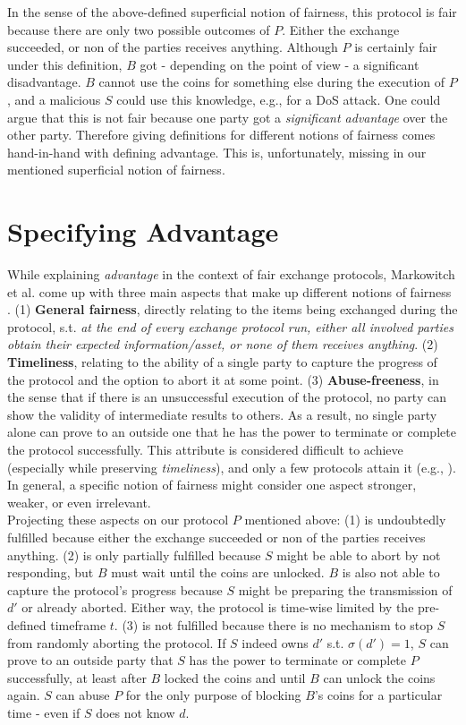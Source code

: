 \documentclass{cacthesis}
\newcounter{protocol}
\begin{document}
        In the sense of the above-defined superficial notion of fairness, this protocol is fair because there are only two possible outcomes of $P$. Either the exchange succeeded, or non of the parties receives anything. 
        Although $P$ is certainly fair under this definition, $B$ got - depending on the point of view - a significant disadvantage. $B$ cannot use the coins for something else during the execution of $P$, and a malicious $S$ could use this knowledge, e.g., for a DoS attack. One could argue that this is not fair because one party got a \textit{significant advantage} over the other party. Therefore giving definitions for different notions of fairness comes hand-in-hand with defining advantage. This is, unfortunately, missing in our mentioned superficial notion of fairness. 
        
        \section{Specifying Advantage}
        While explaining \textit{advantage} in the context of fair exchange protocols, Markowitch et al. come up with three main aspects that make up different notions of fairness \cite{10.1007/3-540-36552-4_31}. (1) \textbf{General fairness}, directly relating to the items being exchanged during the protocol, s.t. \textit{at the end of every exchange protocol run, either all involved parties obtain their expected information/asset, or none of them receives anything}.  (2) \textbf{Timeliness}, relating to the ability of a single party to capture the progress of the protocol and the option to abort it at some point. (3) \textbf{Abuse-freeness}, in the sense that if there is an unsuccessful execution of the protocol, no party can show the validity of intermediate results to others. As a result, no single party alone can prove to an outside one that he has the power to terminate or complete the protocol successfully. This attribute is considered difficult to achieve (especially while preserving \textit{timeliness}), and only a few protocols attain it (e.g., \cite{Gao2008}). In general, a specific notion of fairness might consider one aspect stronger, weaker, or even irrelevant. \\
        Projecting these aspects on our protocol $P$ mentioned above: (1) is undoubtedly fulfilled because either the exchange succeeded or non of the parties receives anything. (2) is only partially fulfilled because $S$ might be able to abort by not responding, but $B$ must wait until the coins are unlocked. $B$ is also not able to capture the protocol's progress because $S$ might be preparing the transmission of $d'$ or already aborted. Either way, the protocol is time-wise limited by the pre-defined timeframe $t$. (3) is not fulfilled because there is no mechanism to stop $S$ from randomly aborting the protocol. If $S$ indeed owns $d'$ s.t. $\sigma\left( d'\right) =1$, $S$ can prove to an outside party that $S$ has the power to terminate or complete $P$ successfully, at least after $B$ locked the coins and until $B$ can unlock the coins again. $S$ can abuse $P$ for the only purpose of blocking $B$'s coins for a particular time - even if $S$ does not know $d$. 
        
\end{document}
